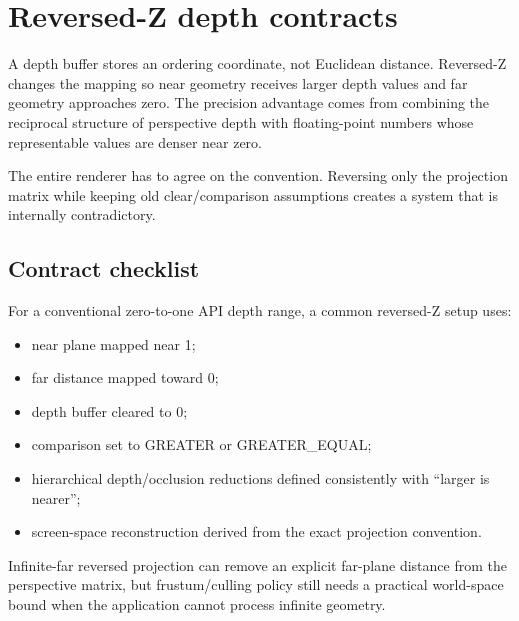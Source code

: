 \hypertarget{appendix-275ec8847057}{}\label{referencestart:appendix-275ec8847057}
\section{Reversed-Z depth contracts}\label{appendix-275ec8847057-reversed-z-depth-contracts}

\hypertarget{appendix-275ec8847057-reversed-z-depth-contracts}{}

A depth buffer stores an ordering coordinate, not Euclidean distance. Reversed-Z changes the mapping so near geometry receives larger depth values and far geometry approaches zero. The precision advantage comes from combining the reciprocal structure of perspective depth with floating-point numbers whose representable values are denser near zero.

The entire renderer has to agree on the convention. Reversing only the projection matrix while keeping old clear/comparison assumptions creates a system that is internally contradictory.

\subsection{Contract checklist}\label{appendix-275ec8847057-contract-checklist}

\hypertarget{appendix-275ec8847057-contract-checklist}{}

For a conventional zero-to-one API depth range, a common reversed-Z setup uses:

\begin{itemize}
\tightlist
\item
  near plane mapped near 1;
\item
  far distance mapped toward 0;
\item
  depth buffer cleared to 0;
\item
  comparison set to GREATER or GREATER\_EQUAL;
\item
  hierarchical depth/occlusion reductions defined consistently with ``larger is nearer'';
\item
  screen-space reconstruction derived from the exact projection convention.
\end{itemize}

Infinite-far reversed projection can remove an explicit far-plane distance from the perspective matrix, but frustum/culling policy still needs a practical world-space bound when the application cannot process infinite geometry.

